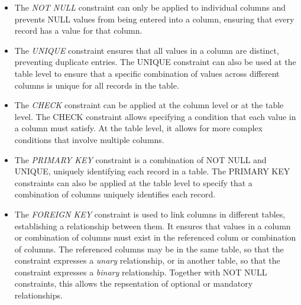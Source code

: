 \begin{itemize}
\item The \emph{NOT NULL} constraint can only be applied to individual columns and prevents NULL values from being entered into a column, ensuring that every record has a value for that column. 
\item The \emph{UNIQUE} constraint ensures that all values in a column are distinct, preventing duplicate entries. The UNIQUE constraint can also be used at the table level to ensure that a specific combination of values across different columns is unique for all records in the table. 
\item The \emph{CHECK} constraint can be applied at the column level or at the table level. The CHECK constraint allows specifying a condition that each value in a column must satisfy. At the table level, it allows for more complex conditions that involve multiple columns. 
\item The \emph{PRIMARY KEY} constraint is a combination of NOT NULL and UNIQUE, uniquely identifying each record in a table. The PRIMARY KEY constraints can also be applied at the table level to specify that a combination of columns uniquely identifies each record. 
\item The \emph{FOREIGN KEY} constraint is used to link columns in different tables, establishing a relationship between them. It ensures that values in a column or combination of columns must exist in the referenced colum or combination of columns. The referenced columns may be in the same table, so that the constraint expresses a \emph{unary} relationship, or in another table, so that the constraint expresses a \emph{binary} relationship. Together with NOT NULL constraints, this allows the repsentation of optional or mandatory relationships. 
\end{itemize}

